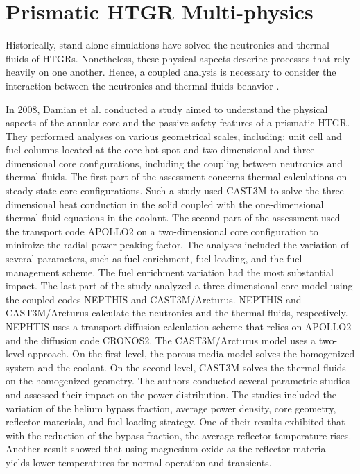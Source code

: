 \section{Prismatic HTGR Multi-physics}
\label{sec:litreview-multi}

Historically, stand-alone simulations have solved the neutronics and thermal-fluids of \glspl{HTGR}.
Nonetheless, these physical aspects describe processes that rely heavily on one another.
Hence, a coupled analysis is necessary to consider the interaction between the neutronics and thermal-fluids behavior \cite{tak_cappgamma_2016}.

In 2008, Damian et al. \cite{damian_vhtr_2008} conducted a study aimed to understand the physical aspects of the annular core and the passive safety features of a prismatic \gls{HTGR}.
They performed analyses on various geometrical scales, including: unit cell and fuel columns located at the core hot-spot and two-dimensional and three-dimensional core configurations, including the coupling between neutronics and thermal-fluids.
The first part of the assessment concerns thermal calculations on steady-state core configurations.
Such a study used CAST3M \cite{studer_cast3marcturus_2007} to solve the three-dimensional heat conduction in the solid coupled with the one-dimensional thermal-fluid equations in the coolant.
The second part of the assessment used the transport code APOLLO2 \cite{sanchez_apollo2_1999} on a two-dimensional core configuration to minimize the radial power peaking factor.
The analyses included the variation of several parameters, such as fuel enrichment, fuel loading, and the fuel management scheme.
The fuel enrichment variation had the most substantial impact.
The last part of the study analyzed a three-dimensional core model using the coupled codes NEPTHIS \cite{cavalier_presentation_2005} and CAST3M/Arcturus.
NEPTHIS and CAST3M/Arcturus calculate the neutronics and the thermal-fluids, respectively.
NEPHTIS uses a transport-diffusion calculation scheme that relies on APOLLO2 and the diffusion code CRONOS2.
The CAST3M/Arcturus model uses a two-level approach.
On the first level, the porous media model solves the homogenized system and the coolant.
On the second level, CAST3M solves the thermal-fluids on the homogenized geometry.
The authors conducted several parametric studies and assessed their impact on the power distribution.
The studies included the variation of the helium bypass fraction, average power density, core geometry, reflector materials, and fuel loading strategy.
One of their results exhibited that with the reduction of the bypass fraction, the average reflector temperature rises.
Another result showed that using magnesium oxide as the reflector material yields lower temperatures for normal operation and transients.

